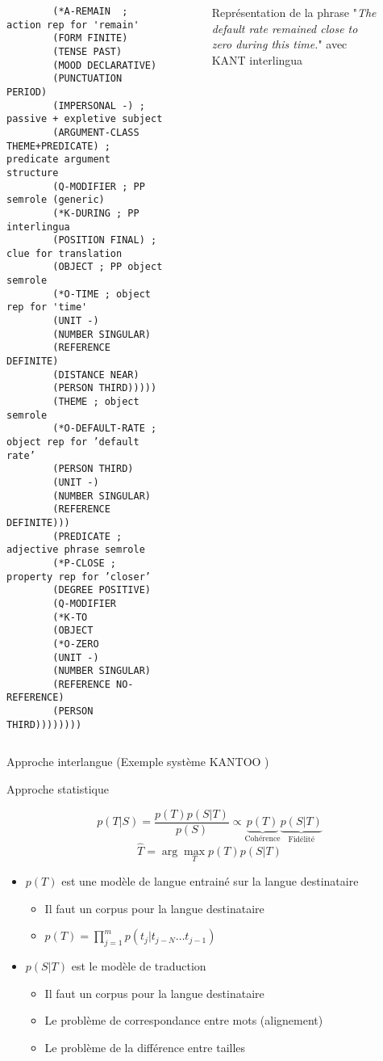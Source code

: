\documentclass{KodeBook}
\begin{document}
 \begin{columns}
 	\begin{column}{0.5\textwidth}
 		\fontsize{4}{5}\selectfont\bfseries
 		\begin{verbatim}
 		(*A-REMAIN  ; action rep for 'remain'
 		(FORM FINITE)
 		(TENSE PAST)
 		(MOOD DECLARATIVE)
 		(PUNCTUATION PERIOD)
 		(IMPERSONAL -) ; passive + expletive subject
 		(ARGUMENT-CLASS THEME+PREDICATE) ; predicate argument structure
 		(Q-MODIFIER ; PP semrole (generic)
 		(*K-DURING ; PP interlingua
 		(POSITION FINAL) ; clue for translation
 		(OBJECT ; PP object semrole
 		(*O-TIME ; object rep for 'time'
 		(UNIT -)
 		(NUMBER SINGULAR)
 		(REFERENCE DEFINITE)
 		(DISTANCE NEAR)
 		(PERSON THIRD)))))
 		(THEME ; object semrole
 		(*O-DEFAULT-RATE ; object rep for ’default rate’
 		(PERSON THIRD)
 		(UNIT -)
 		(NUMBER SINGULAR)
 		(REFERENCE DEFINITE)))
 		(PREDICATE ; adjective phrase semrole
 		(*P-CLOSE ; property rep for ’closer’
 		(DEGREE POSITIVE)
 		(Q-MODIFIER
 		(*K-TO
 		(OBJECT
 		(*O-ZERO
 		(UNIT -)
 		(NUMBER SINGULAR)
 		(REFERENCE NO-REFERENCE)
 		(PERSON THIRD))))))))
 		\end{verbatim}
 	\end{column}
 	\begin{column}{0.5\textwidth}
 		\begin{figure}
 			\caption{Représentation de la phrase "\textit{The default rate remained close to zero during this time.}" avec KANT interlingua \cite{98-czuba-al}}
 		\end{figure}
 	\end{column}
 \end{columns}

Approche interlangue (Exemple système KANTOO \cite{00-nyberg-al})


Approche statistique

\[
p(T|S) = \frac{p(T) p(S|T)}{p(S)} \propto \underbrace{p(T)}_\text{Cohérence} \underbrace{p(S|T)}_\text{Fidélité}
\]
\[\hat{T} = \arg\max_{T} p(T) p(S|T)\]
\[\]
\begin{itemize}
	\item $p(T)$ est une modèle de langue entrainé sur la langue destinataire
	\begin{itemize}
		\item Il faut un corpus pour la langue destinataire
		\item $p(T) = \prod_{j=1}^m p(t_j|t_{j-N}\ldots t_{j-1})$
	\end{itemize}
	
	\item $p(S|T)$ est le modèle de traduction 
	\begin{itemize}
		\item Il faut un corpus pour la langue destinataire
		\item Le problème de correspondance entre mots (alignement)
		\item Le problème de la différence entre tailles
	\end{itemize}
\end{itemize}
\end{document}
